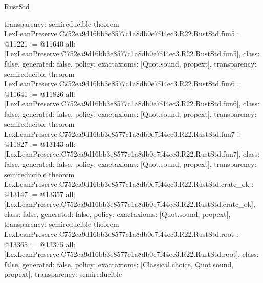 \begin{lexlean}{RustStd}
\begin{coremodule}
{  transparency: semireducible
}
theorem LexLeanPreserve.C752ea9d16bb3e8577c1a8db0e7f44ec3.R22.RustStd.fun5 : @11221 := @11640 {
  all: [LexLeanPreserve.C752ea9d16bb3e8577c1a8db0e7f44ec3.R22.RustStd.fun5],
  class: false,
  generated: false,
  policy: exact{axioms: [Quot.sound, propext]},
  transparency: semireducible
}
theorem LexLeanPreserve.C752ea9d16bb3e8577c1a8db0e7f44ec3.R22.RustStd.fun6 : @11641 := @11826 {
  all: [LexLeanPreserve.C752ea9d16bb3e8577c1a8db0e7f44ec3.R22.RustStd.fun6],
  class: false,
  generated: false,
  policy: exact{axioms: [Quot.sound, propext]},
  transparency: semireducible
}
theorem LexLeanPreserve.C752ea9d16bb3e8577c1a8db0e7f44ec3.R22.RustStd.fun7 : @11827 := @13143 {
  all: [LexLeanPreserve.C752ea9d16bb3e8577c1a8db0e7f44ec3.R22.RustStd.fun7],
  class: false,
  generated: false,
  policy: exact{axioms: [Quot.sound, propext]},
  transparency: semireducible
}
theorem LexLeanPreserve.C752ea9d16bb3e8577c1a8db0e7f44ec3.R22.RustStd.crate_ok : @13147 := @13357 {
  all: [LexLeanPreserve.C752ea9d16bb3e8577c1a8db0e7f44ec3.R22.RustStd.crate_ok],
  class: false,
  generated: false,
  policy: exact{axioms: [Quot.sound, propext]},
  transparency: semireducible
}
theorem LexLeanPreserve.C752ea9d16bb3e8577c1a8db0e7f44ec3.R22.RustStd.root : @13365 := @13375 {
  all: [LexLeanPreserve.C752ea9d16bb3e8577c1a8db0e7f44ec3.R22.RustStd.root],
  class: false,
  generated: false,
  policy: exact{axioms: [Classical.choice, Quot.sound, propext]},
  transparency: semireducible
}


\end{coremodule}
\end{lexlean}
